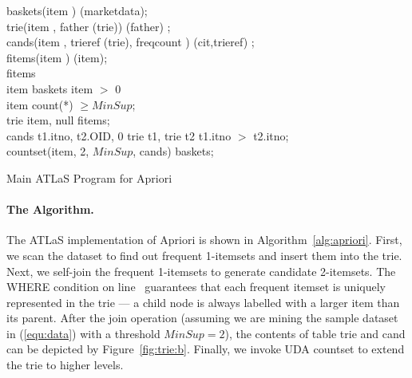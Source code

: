 {\renewcommand{\baselinestretch}{1}
\normalsize

\begin{algorithm}[tb]
\begin{algorithmic}[1]

  \STATE{} baskets(item ) (marketdata);\\
  \STATE{} trie(item , father (trie)) (father) ;\\
  \STATE{} cands(item , trieref (trie), freqcount )
   (cit,trieref) ;\\
  \STATE{} fitems(item ) (item);\\
  \STATE{} fitems \\
  \hspace{.4cm} item  baskets  item $>$ 0 \\
  \hspace{.4cm} item  count(*) $\ge MinSup$;\\
  \STATE{}  trie  item, null  fitems;\\
  \STATE{}  cands  t1.itno, t2.OID, 0  trie  t1, trie  t2   t1.itno $>$ t2.itno;\\
  \STATE{} countset(item, 2, $MinSup$, cands)  baskets;
\end{algorithmic}
\caption{Main ATLaS Program for Apriori}
\label{alg:apriori}
\end{algorithm}

\inv \paragraph{The Algorithm.} The ATLaS implementation of Apriori is shown in
Algorithm~\ref{alg:apriori}.  First, we scan the dataset to find out
frequent 1-itemsets and insert them into the trie. Next, we self-join
the frequent 1-itemsets to generate candidate 2-itemsets. The {\cw
  WHERE} condition on line~ guarantees that each
frequent itemset is uniquely represented in the trie --- a child node
is always labelled with a larger item than its parent.  After the join
operation (assuming we are mining the sample dataset in (\ref{equ:data}) with a
threshold $MinSup=2$), the contents of table {\bw trie} and {\bw cand}
can be depicted by Figure~\ref{fig:trie:b}. Finally, we invoke UDA
{\bw countset} to extend the trie to higher levels.

}

